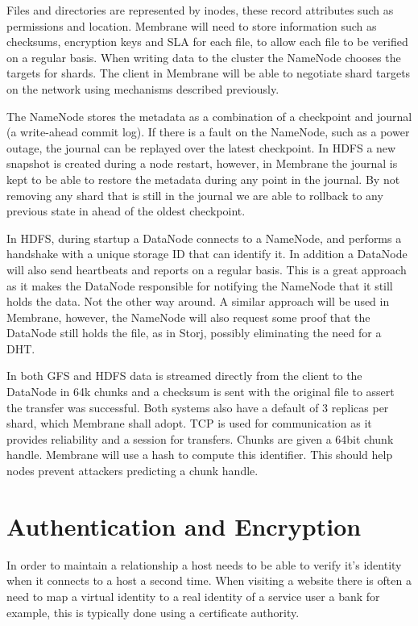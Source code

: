 \documentclass[11pt, a4paper, twocolumn, twoside]{report}
\begin{document}
Files and directories are represented by inodes, these record attributes such as permissions and location. Membrane will need to store information such as checksums, encryption keys and SLA for each file, to allow each file to be verified on a regular basis. When writing data to the cluster the NameNode chooses the targets for shards. The client in Membrane will be able to negotiate shard targets on the network using mechanisms described previously.

The NameNode stores the metadata as a combination of a checkpoint and journal (a write-ahead commit log). If there is a fault on the NameNode, such as a power outage, the journal can be replayed over the latest checkpoint. In HDFS a new snapshot is created during a node restart, however, in Membrane the journal is kept to be able to restore the metadata during any point in the journal. By not removing any shard that is still in the journal we are able to rollback to any previous state in ahead of the oldest checkpoint.

In HDFS, during startup a DataNode connects to a NameNode, and performs a handshake with a unique storage ID that can identify it. In addition a DataNode will also send heartbeats and reports on a regular basis. \cite{hdfsAnalysis} This is a great approach as it makes the DataNode responsible for notifying the NameNode that it still holds the data. Not the other way around. A similar approach will be used in Membrane, however, the NameNode will also request some proof that the DataNode still holds the file, as in Storj, possibly eliminating the need for a DHT.

In both GFS and HDFS data is streamed directly from the client to the DataNode in 64k chunks and a checksum is sent with the original file to assert the transfer was successful. Both systems also have a default of 3 replicas per shard, which Membrane shall adopt. TCP is used for communication as it provides reliability and a session for transfers. Chunks are given a 64bit chunk handle. Membrane will use a hash to compute this identifier. This should help nodes prevent attackers predicting a chunk handle.

\section{Authentication and Encryption} \label{sec:encryption}

In order to maintain a relationship a host needs to be able to verify it's identity when it connects to a host a second time. When visiting a website there is often a need to map a virtual identity to a real identity of a service user \citep{hericourt2001method} a bank for example, this is typically done using a certificate authority.
\end{document}
